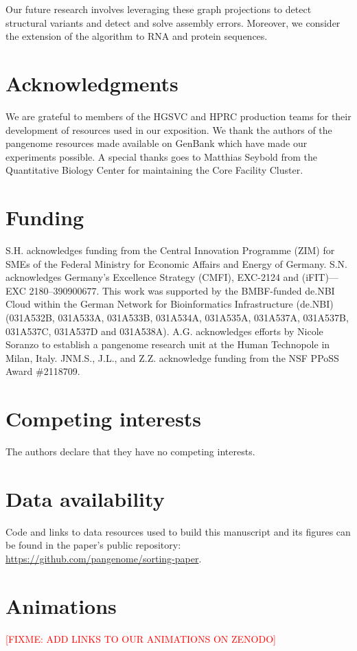 \documentclass{bioinfo}
\theoremstyle{definition}
\newcommand{\red}[1]{{\textcolor{Red}{#1}}}
\newcommand{\FIXME}[1]{\red{[FIXME: #1]}}
\begin{document}
	Our future research involves leveraging these graph projections to detect structural variants and detect and solve assembly errors.
	Moreover, we consider the extension of the algorithm to RNA and protein sequences.
	
	\section*{Acknowledgments}
	
	We are grateful to members of the HGSVC and HPRC production teams for their development of resources used in our exposition.
	We thank the authors of the pangenome resources made available on GenBank which have made our experiments possible.
	A special thanks goes to Matthias Seybold from the Quantitative Biology Center for maintaining the Core Facility Cluster.
	
	\section*{Funding}
	
	S.H. acknowledges funding from the Central Innovation Programme (ZIM) for SMEs of the Federal Ministry for Economic Affairs and Energy of Germany.
	S.N. acknowledges Germany’s Excellence Strategy (CMFI), EXC-2124 and (iFIT)—EXC 2180–390900677.
	This work was supported by the BMBF-funded de.NBI Cloud within the German Network for Bioinformatics Infrastructure (de.NBI) (031A532B, 031A533A, 031A533B, 031A534A, 031A535A, 031A537A, 031A537B, 031A537C, 031A537D and 031A538A).
	A.G. acknowledges efforts by Nicole Soranzo to establish a pangenome research unit at the Human Technopole in Milan, Italy.
	JNM.S., J.L., and Z.Z. acknowledge funding from the NSF PPoSS Award \#2118709.
	
	\section*{Competing interests}
	The authors declare that they have no competing interests.
	
	\section*{Data availability}
	
	Code and links to data resources used to build this manuscript and its figures can be found in the paper's public repository: \url{https://github.com/pangenome/sorting-paper}.
	
	\section{Animations}
	\FIXME{ADD LINKS TO OUR ANIMATIONS ON ZENODO}
	
\end{document}
